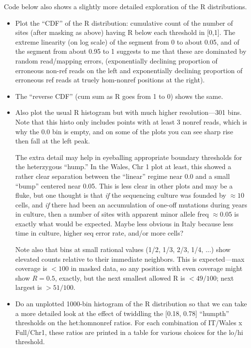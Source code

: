 \documentclass{article}\usepackage[]{graphicx}\usepackage[]{color}
\begin{document}
\noindent Code below also shows a slightly more detailed exploration of the R distributions.  
\begin{itemize}
  \item Plot the ``CDF'' of the R distribution: cumulative count of the number of sites (after masking as above) having R below each threshold in [0,1].  The extreme linearity (on log scale) of the segment from 0 to about 0.05, and of the segment from about 0.95 to 1 suggests to me that these are dominated by random read/mapping errors, (exponentially declining proportion of erroneous non-ref reads on the left and exponentially declining proportion of erroneous ref reads at truely hom-nonref positions at the right).
  \item The ``reverse CDF'' (cum sum as R goes from 1 to 0) shows the same.
  \item Also plot the usual R histogram but with much higher resolution---301 bins.  Note that this histo only includes points with at least 3 nonref reads, which is why the 0.0 bin is empty, and on some of the plots you can see sharp rise then fall at the left peak.
  
  The extra detail may help in eyeballing appropriate boundary thresholds for the heterzygous ``hump.''  In the Wales, Chr 1 plot at least, this showed a rather clear separation between the ``linear'' regime near 0.0 and a small ``bump'' centered near 0.05.  This is less clear in other plots and may be a fluke, but one thought is that \emph{if} the sequencing culture was founded by $\approx 10$ cells, and \emph{if} there had been an accumulation of one-off mutations during years in culture, then a number of sites with apparent minor allele freq $\approx 0.05$ is exactly what would be expected.  Maybe less obvious in Italy because less time in culture, higher seq error rate, and/or more cells?
  
  Note also that bins at small rational values (1/2, 1/3, 2/3, 1/4, ...) show elevated counts relative to their immediate neighbors.  This is expected---max coverage is $<100$ in masked data, so any position with even coverage might show $R=0.5$, exactly, but the next smallest allowed R is $< 49/100$; next largest is $>51/100$.
  
  \item Do an unplotted 1000-bin histogram of the R distribution so that we can take a more detailed look at the effect of twiddling the [0.18, 0.78] ``humpth'' thresholds on the het:homnonref ratios.  For each combination of IT/Wales x Full/Chr1, these ratios are printed in a table for various choices for the lo/hi threshold.
  

\end{itemize}
\end{document}
